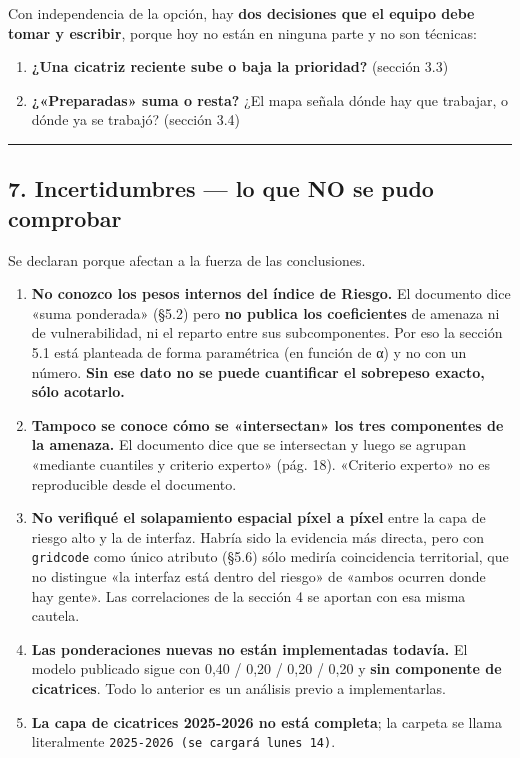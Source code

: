 \documentclass[
  spanish,
  10pt,
]{article}
\providecommand{\tightlist}{%
  \setlength{\itemsep}{0pt}\setlength{\parskip}{0pt}}
\begin{document}
Con independencia de la opción, hay \textbf{dos decisiones que el equipo
debe tomar y escribir}, porque hoy no están en ninguna parte y no son
técnicas:

\begin{enumerate}
\def\labelenumi{\arabic{enumi}.}
\tightlist
\item
  \textbf{¿Una cicatriz reciente sube o baja la prioridad?} (sección
  3.3)
\item
  \textbf{¿«Preparadas» suma o resta?} ¿El mapa señala dónde hay que
  trabajar, o dónde ya se trabajó? (sección 3.4)
\end{enumerate}

\begin{center}\rule{0.5\linewidth}{0.5pt}\end{center}

\subsection{7. Incertidumbres --- lo que NO se pudo
comprobar}\label{incertidumbres-lo-que-no-se-pudo-comprobar}

Se declaran porque afectan a la fuerza de las conclusiones.

\begin{enumerate}
\def\labelenumi{\arabic{enumi}.}
\tightlist
\item
  \textbf{No conozco los pesos internos del índice de Riesgo.} El
  documento dice «suma ponderada» (§5.2) pero \textbf{no publica los
  coeficientes} de amenaza ni de vulnerabilidad, ni el reparto entre sus
  subcomponentes. Por eso la sección 5.1 está planteada de forma
  paramétrica (en función de α) y no con un número. \textbf{Sin ese dato
  no se puede cuantificar el sobrepeso exacto, sólo acotarlo.}
\item
  \textbf{Tampoco se conoce cómo se «intersectan» los tres componentes
  de la amenaza.} El documento dice que se intersectan y luego se
  agrupan «mediante cuantiles y criterio experto» (pág. 18). «Criterio
  experto» no es reproducible desde el documento.
\item
  \textbf{No verifiqué el solapamiento espacial píxel a píxel} entre la
  capa de riesgo alto y la de interfaz. Habría sido la evidencia más
  directa, pero con \texttt{gridcode} como único atributo (§5.6) sólo
  mediría coincidencia territorial, que no distingue «la interfaz está
  dentro del riesgo» de «ambos ocurren donde hay gente». Las
  correlaciones de la sección 4 se aportan con esa misma cautela.
\item
  \textbf{Las ponderaciones nuevas no están implementadas todavía.} El
  modelo publicado sigue con 0,40 / 0,20 / 0,20 / 0,20 y \textbf{sin
  componente de cicatrices}. Todo lo anterior es un análisis previo a
  implementarlas.
\item
  \textbf{La capa de cicatrices 2025-2026 no está completa}; la carpeta
  se llama literalmente \texttt{2025-2026\ (se\ cargará\ lunes\ 14)}.
\end{enumerate}
\end{document}
